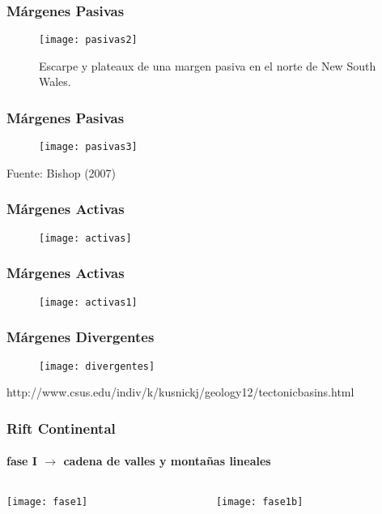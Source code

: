 \documentclass{beamer}
\begin{document}
\begin{frame}
\frametitle{Márgenes Pasivas}
\begin{center}
\begin{figure}
\texttt{[image: pasivas2]}
\caption{Escarpe y plateaux de una margen pasiva en el norte de New South Wales.}
\end{figure}
\end{center}
\end{frame}
\begin{frame}
\frametitle{Márgenes Pasivas}
\begin{center}
\begin{figure}
\texttt{[image: pasivas3]}
\end{figure}
\end{center}
\tiny{Fuente: Bishop (2007)}
\end{frame}
\begin{frame}
\frametitle{Márgenes Activas}
\begin{center}
\begin{figure}
\texttt{[image: activas]}
\end{figure}
\end{center}
\end{frame}
\begin{frame}
\frametitle{Márgenes Activas}
\begin{center}
\begin{figure}
\texttt{[image: activas1]}
\end{figure}
\end{center}
\end{frame}
\begin{frame}
\frametitle{Márgenes Divergentes}
\begin{center}
\begin{figure}
\texttt{[image: divergentes]}
\end{figure}
\end{center}
\tiny{http://www.csus.edu/indiv/k/kusnickj/geology12/tectonicbasins.html}
\end{frame}
\begin{frame}
\frametitle{Rift Continental}
\framesubtitle{fase I $\rightarrow$ cadena de valles y montañas lineales}
\begin{center}
\begin{columns}
		\begin{column}{.5\linewidth}
		 \texttt{[image: fase1]}
		\end{column}
		\begin{column}{.5\linewidth}
			 \texttt{[image: fase1b]}
		\end{column}
\end{columns}
\end{center}
\end{frame}
\end{document}
